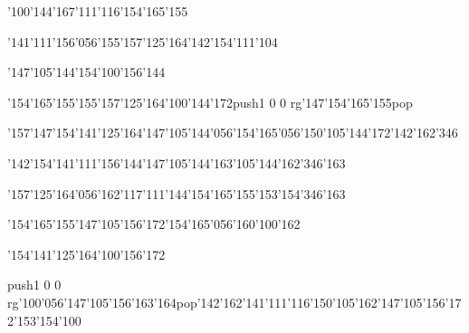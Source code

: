 \null\vfill\ipa\centerline{\enskip\enskip\enskip\enskip\enskip\enskip\enskip\enskip\char'100\char'144\enskip\char'167\char'111\char'116\enskip\enskip\enskip\enskip\enskip\enskip\char'154\char'165\char'155\enskip\enskip\enskip\enskip}\medskip\centerline{\enskip\char'141\char'111\char'156\char'056\char'155\char'157\char'125\char'164\enskip\enskip\enskip\enskip\enskip\enskip\enskip\enskip\enskip\enskip\enskip\char'142\char'154\char'111\char'104}\medskip\centerline{\enskip\char'147\char'105\char'144\enskip\enskip\enskip\enskip\char'154\char'100\char'156\char'144\enskip\enskip\enskip\enskip\enskip\enskip}\medskip\centerline{\enskip\enskip\enskip\enskip\char'154\char'165\char'155\enskip\enskip\enskip\enskip\enskip\char'155\char'157\char'125\char'164\enskip\char'100\char'144\char'172\enskip\pdfcolorstack\match push{1 0 0 rg}\char'147\char'154\char'165\char'155\pdfcolorstack\match pop{}}\medskip\centerline{\enskip\char'157\enskip\enskip\enskip\enskip\enskip\enskip\enskip\enskip\enskip\char'147\char'154\char'141\char'125\char'164\enskip\char'147\char'105\char'144\char'056\char'154\char'165\char'056\char'150\char'105\char'144\char'172\enskip\char'142\char'162\char'346}\medskip\vfill\footline{\hfil\tt\folio\hfil}\eject
\null\vfill\ipa\centerline{\enskip\char'142\char'154\char'141\char'111\char'156\char'144\enskip\enskip\enskip\enskip\char'147\char'105\char'144\enskip\enskip\enskip\enskip\enskip\enskip\char'163\char'105\char'144\enskip\char'162\char'346\char'163}\medskip\centerline{\enskip\char'157\char'125\char'164\char'056\char'162\char'117\char'111\char'144\enskip\enskip\enskip\enskip\char'154\char'165\char'155\enskip\enskip\enskip\enskip\enskip\char'153\char'154\char'346\char'163}\medskip\centerline{\enskip\char'154\char'165\char'155\enskip\enskip\enskip\enskip\char'147\char'105\char'156\char'172\enskip\char'154\char'165\char'056\char'160\char'100\char'162}\medskip\centerline{\enskip\enskip\enskip\enskip\enskip\enskip\enskip\enskip\enskip\enskip\enskip\enskip\char'154\char'141\char'125\char'164\enskip\char'100\char'156\char'172\enskip\enskip\enskip\enskip\enskip}\medskip\centerline{\enskip\pdfcolorstack\match push{1 0 0 rg}\char'100\char'056\char'147\char'105\char'156\char'163\char'164\pdfcolorstack\match pop{}\enskip\enskip\enskip\char'142\char'162\char'141\char'111\char'116\enskip\char'150\char'105\char'162\enskip\enskip\enskip\char'147\char'105\char'156\char'172\enskip\char'153\char'154\char'100}\medskip\vfill\footline{\hfil\tt\folio\hfil}\eject

